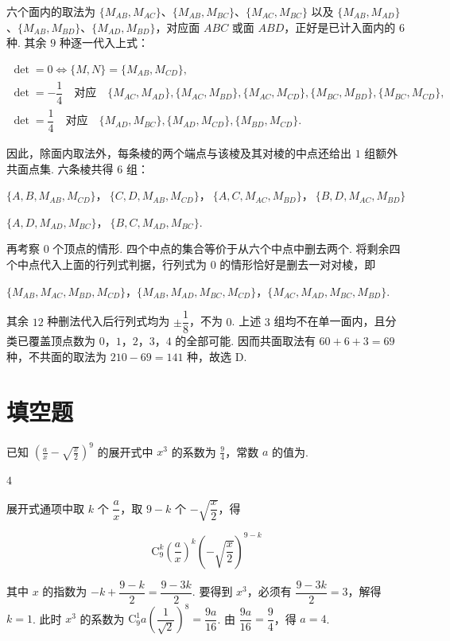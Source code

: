 \documentclass[UTF8,a4paper,oneside,11pt]{ctexbook}
\begin{document}
\begin{solution}
六个面内的取法为 \(\{M_{AB},M_{AC}\}\)、\(\{M_{AB},M_{BC}\}\)、\(\{M_{AC},M_{BC}\}\) 以及 \(\{M_{AB},M_{AD}\}\)、\(\{M_{AB},M_{BD}\}\)、\(\{M_{AD},M_{BD}\}\)，对应面 \(ABC\) 或面 \(ABD\)，正好是已计入面内的 \(6\) 种. 其余 \(9\) 种逐一代入上式：

\[
\begin{gathered}
\det=0\Longleftrightarrow\{M,N\}=\{M_{AB},M_{CD}\},\\
\det=-\dfrac14\quad\text{对应}\quad\{M_{AC},M_{AD}\},\{M_{AC},M_{BD}\},\{M_{AC},M_{CD}\},\{M_{BC},M_{BD}\},\{M_{BC},M_{CD}\},\\
\det=\dfrac14\quad\text{对应}\quad\{M_{AD},M_{BC}\},\{M_{AD},M_{CD}\},\{M_{BD},M_{CD}\}.
\end{gathered}
\]

因此，除面内取法外，每条棱的两个端点与该棱及其对棱的中点还给出 \(1\) 组额外共面点集. 六条棱共得 \(6\) 组：

\(\{A,B,M_{AB},M_{CD}\}\)，\(\ \{C,D,M_{AB},M_{CD}\}\)，\(\ \{A,C,M_{AC},M_{BD}\}\)，\(\ \{B,D,M_{AC},M_{BD}\}\)

\(\{A,D,M_{AD},M_{BC}\}\)，\(\ \{B,C,M_{AD},M_{BC}\}\).

再考察 \(0\) 个顶点的情形. 四个中点的集合等价于从六个中点中删去两个. 将剩余四个中点代入上面的行列式判据，行列式为 \(0\) 的情形恰好是删去一对对棱，即

\(\{M_{AB},M_{AC},M_{BD},M_{CD}\}\)，\(\{M_{AB},M_{AD},M_{BC},M_{CD}\}\)，\(\{M_{AC},M_{AD},M_{BC},M_{BD}\}\).

其余 \(12\) 种删法代入后行列式均为 \(\pm\dfrac18\)，不为 \(0\). 上述 \(3\) 组均不在单一面内，且分类已覆盖顶点数为 \(0\)，\(1\)，\(2\)，\(3\)，\(4\) 的全部可能. 因而共面取法有 \(60+6+3=69\) 种，不共面的取法为 \(210-69=141\) 种，故选 D.
\end{solution}

\section{填空题}

\begin{problem}
已知 \(\left(\frac{a}{x} - \sqrt{\frac{x}{2}}\right)^{9}\) 的展开式中 \(x^{3}\) 的系数为 \(\frac{9}{4}\)，常数 \(a\) 的值为\fillinblank{}.
\end{problem}

\begin{answer}
\(4\)
\end{answer}

\begin{solution}
展开式通项中取 \(k\) 个 \(\dfrac{a}{x}\)，取 \(9-k\) 个 \(-\sqrt{\dfrac{x}{2}}\)，得

\[
\mathrm C_{9}^{k}\left(\frac{a}{x}\right)^{k}\left(-\sqrt{\frac{x}{2}}\right)^{9-k}
\]

其中 \(x\) 的指数为 \(-k+\dfrac{9-k}{2}=\dfrac{9-3k}{2}\). 要得到 \(x^{3}\)，必须有 \(\dfrac{9-3k}{2}=3\)，解得 \(k=1\). 此时 \(x^{3}\) 的系数为 \(\mathrm C_{9}^{1}a\left(\dfrac{1}{\sqrt{2}}\right)^{8}=\dfrac{9a}{16}\). 由 \(\dfrac{9a}{16}=\dfrac94\)，得 \(a=4\).
\end{solution}
\end{document}
